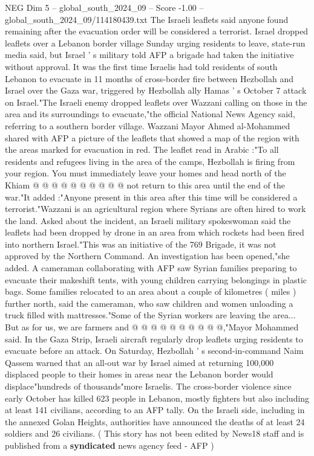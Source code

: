 \begin{textsample}{NEG Dim 5 – global\_south\_2024\_09 – Score -1.00 – global\_south\_2024\_09/114180439.txt}  \label{ex:f5_neg_192}
The Israeli leaflets said anyone found remaining after the evacuation order will be considered a terrorist.
Israel dropped leaflets over a Lebanon border village Sunday urging residents to leave, state-run media said, but Israel ' s military told AFP a brigade had taken the initiative without approval.
It was the first time Israelis had told residents of south Lebanon to evacuate in 11 months of cross-border fire between Hezbollah and Israel over the Gaza war, triggered by Hezbollah ally Hamas ' s October 7 attack on Israel."The Israeli enemy dropped leaflets over Wazzani calling on those in the area and its surroundings to evacuate,"the official National News Agency said, referring to a southern border village.
Wazzani Mayor Ahmed al-Mohammed shared with AFP a picture of the leaflets that showed a map of the region with the areas marked for evacuation in red.
The leaflet read in Arabic :"To all residents and refugees living in the area of the camps, Hezbollah is firing from your region.
You must immediately leave your homes and head north of the Khiam @ @ @ @ @ @ @ @ @ @ not return to this area until the end of the war."It added :"Anyone present in this area after this time will be considered a terrorist."Wazzani is an agricultural region where Syrians are often hired to work the land.
Asked about the incident, an Israeli military spokeswoman said the leaflets had been dropped by drone in an area from which rockets had been fired into northern Israel."This was an initiative of the 769 Brigade, it was not approved by the Northern Command.
An investigation has been opened,"she added.
A cameraman collaborating with AFP saw Syrian families preparing to evacuate their makeshift tents, with young children carrying belongings in plastic bags.
Some families relocated to an area about a couple of kilometres ( miles ) further north, said the cameraman, who saw children and women unloading a truck filled with mattresses."Some of the Syrian workers are leaving the area...
But as for us, we are farmers and @ @ @ @ @ @ @ @ @ @,"Mayor Mohammed said.
In the Gaza Strip, Israeli aircraft regularly drop leaflets urging residents to evacuate before an attack.
On Saturday, Hezbollah ' s second-in-command Naim Qassem warned that an all-out war by Israel aimed at returning 100,000 displaced people to their homes in areas near the Lebanon border would displace"hundreds of thousands"more Israelis.
The cross-border violence since early October has killed 623 people in Lebanon, mostly fighters but also including at least 141 civilians, according to an AFP tally.
On the Israeli side, including in the annexed Golan Heights, authorities have announced the deaths of at least 24 soldiers and 26 civilians. ( This story has not been edited by News18 staff and is published from a \textbf{syndicated} news agency feed - AFP )

\end{textsample}
